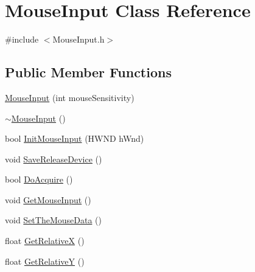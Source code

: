 \hypertarget{class_mouse_input}{\section{Mouse\-Input Class Reference}
\label{class_mouse_input}
}


{\ttfamily \#include $<$Mouse\-Input.\-h$>$}

\subsection*{Public Member Functions}
\begin{DoxyCompactItemize}
\item 
\hyperlink{class_mouse_input_a658d1c14ab590471160988ded246e05c}{Mouse\-Input} (int mouse\-Sensitivity)
\item 
\hyperlink{class_mouse_input_a2ae61cf479be0245aee4a8fef4b05e90}{$\sim$\-Mouse\-Input} ()
\item 
bool \hyperlink{class_mouse_input_a5d5dbe586187445dd0746b42cfb386a2}{Init\-Mouse\-Input} (H\-W\-N\-D h\-Wnd)
\item 
void \hyperlink{class_mouse_input_a6ddf45aec3e8a27c81ccf6f164361346}{Save\-Release\-Device} ()
\item 
bool \hyperlink{class_mouse_input_a336bb5a74324ba0ad9909dd59a3e7c19}{Do\-Acquire} ()
\item 
void \hyperlink{class_mouse_input_a157e0b5d97f64609ac65c1cfb039a68f}{Get\-Mouse\-Input} ()
\item 
void \hyperlink{class_mouse_input_a4bd762d2388561a5ad5537124300373c}{Set\-The\-Mouse\-Data} ()
\item 
float \hyperlink{class_mouse_input_ab7385ac3b4a1faaa5f4a57a3e6027568}{Get\-Relative\-X} ()
\item 
float \hyperlink{class_mouse_input_abbc0863faa6c15bd828acb47b10886c8}{Get\-Relative\-Y} ()
\end{DoxyCompactItemize}


